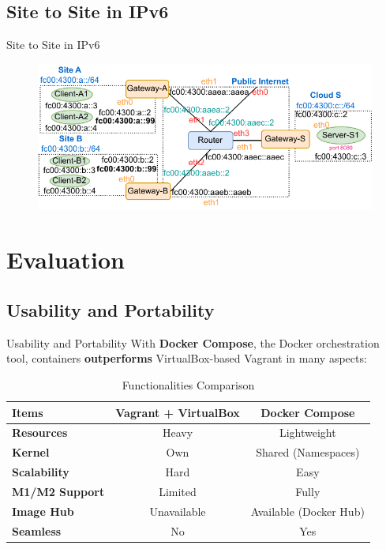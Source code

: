 \documentclass{beamer}
\begin{document}
\subsection{Site to Site in IPv6}
\begin{frame}{Site to Site in IPv6}
\begin{figure}[t!]
  \begin{center}
    \includegraphics[scale=0.95]{figures/ipv6-site-to-site.pdf}
    \label{fig:ipv6site2site}
  \end{center}
\end{figure}
\end{frame}

\section{Evaluation}
\subsection{Usability and Portability}
\begin{frame}{Usability and Portability}
With \textbf{Docker Compose}, the Docker orchestration tool, containers \textbf{outperforms} VirtualBox-based Vagrant in many aspects:
\begin{table}[t!]
  \begin{center}
    \caption{Functionalities Comparison}
    \begin{tabular}{|l|c|c|}
    \hline
    \textbf{Items} & \textbf{Vagrant + VirtualBox} & \textbf{Docker Compose} \\
    \hline
    \textbf{Resources} & Heavy & Lightweight \\
    \hline
    \textbf{Kernel} & Own & Shared (Namespaces)\\
    \hline
    \textbf{Scalability} & Hard & Easy \\
    \hline
    \textbf{M1/M2 Support} & Limited & Fully \\
    \hline
    \textbf{Image Hub} & Unavailable & Available (Docker Hub) \\
    \hline
    \textbf{Seamless} & No & Yes \\
    \hline
    \end{tabular}
    \label{tab:compare}
  \end{center}
\end{table}
\end{frame}
\end{document}
